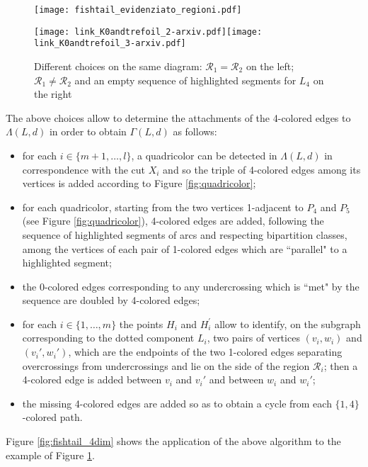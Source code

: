\documentclass[12pt,a4paper]{article}
\newcommand{\G}{\Gamma}
\begin{document}
\begin{figure} [h!]
    \centering
    \texttt{[image: fishtail\_evidenziato\_regioni.pdf]}
\caption{}
    \label{fig:fishtail_choices}
\end{figure}

\begin{figure} [h!]
    \centering
    \texttt{[image: link\_K0andtrefoil\_2-arxiv.pdf]}\quad\texttt{[image: link\_K0andtrefoil\_3-arxiv.pdf]}
\caption{Different choices on the same diagram: $\mathcal R_1=\mathcal R_2$ on the left; $\mathcal R_1\neq\mathcal R_2$ and an empty sequence of highlighted segments for $L_4$ on the right}
    \label{fig:K0&trefoil}
\end{figure}

The above choices allow to determine the attachments of the 4-colored edges to $\Lambda(L,d)$ in order to obtain $\G(L,d)$ as follows:
\begin{itemize}
\item for each $i\in\{m+1,\ldots,l\}$, a quadricolor can be detected in $\Lambda(L,d)$ in correspondence with the cut $X_i$ and so the triple of 4-colored edges among its vertices is added according to Figure \ref{fig:quadricolor};
\item for each quadricolor, starting from the two vertices 1-adjacent to $P_4$ and $P_5$ (see Figure \ref{fig:quadricolor}), 4-colored edges are added, following the sequence of highlighted segments of arcs and respecting bipartition classes, among the vertices of each pair of 1-colored edges which are ``parallel" to a highlighted segment; 
\item the 0-colored edges corresponding to any undercrossing which is ``met" by the sequence are doubled by 4-colored edges;
\item for each $i\in\{1,\ldots,m\}$ the points $H_i$ and $H_i^\prime$ allow to identify, on the subgraph corresponding to the dotted component $L_i$, two pairs of vertices $(v_i,w_i)$ and $(v_i',w_i')$, which are the endpoints of the two 1-colored edges separating overcrossings from undercrossings and lie on the side of the region $\mathcal R_i$; then a 4-colored edge is added between $v_i$ and $v_i'$ and between $w_i$ and $w_i'$; 
\item the missing 4-colored edges are added so as to obtain a cycle from each $\{1,4\}$-colored path.
\end{itemize}

Figure \ref{fig:fishtail_4dim} shows the application of the above algorithm to the example of Figure \ref{fig:fishtail_choices}. 
\end{document}
